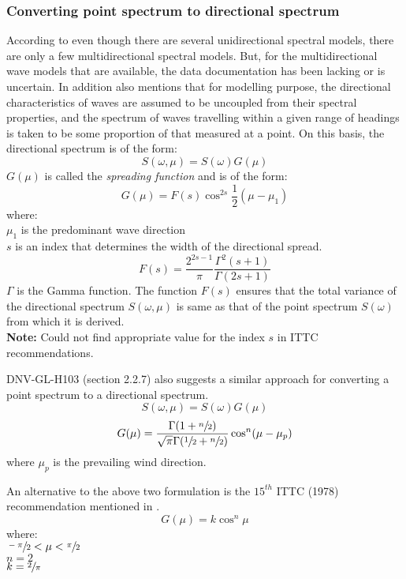 \subsubsection{Converting point spectrum to directional spectrum}
\label{Converting point spectrum to directional spectrum}
According to \cite{stansberg2002specialist} even though there are several
unidirectional spectral models, there are only a few multidirectional spectral
models. But, for the multidirectional wave models that are available, the 
data documentation has been lacking or is uncertain. In addition
\cite{stansberg2002specialist} also mentions that for modelling purpose, the
directional characteristics of waves are assumed to be uncoupled from their
spectral properties, and the spectrum of waves travelling within a given range
of headings is taken to be some proportion of that measured at a point. On this
basis, the directional spectrum is of the form:
\begin{equation}
  S(\omega, \mu) = S(\omega) G(\mu)
\end{equation}
$G(\mu)$ is called the \textit{spreading function} and is of the form:
\begin{equation}
  G(\mu) = F(s) \cos^{2s} \frac{1}{2} (\mu - \mu_1)
\end{equation}
where:\\ 
$\mu_1$ is the predominant wave direction  \\
$s$ is an index that determines the width of the directional spread.
\begin{equation}
  F(s) = \frac{2^{2s - 1}}{\pi} \frac{\Gamma^2 (s+1)}{\Gamma (2s + 1)}
\end{equation}
$\Gamma$ is the Gamma function. The function $F(s)$ ensures that the total
variance of the directional spectrum $S(\omega, \mu)$ is same as that of the
point spectrum $S(\omega)$ from which it is derived.\\
\textbf{Note:} Could not find appropriate value for the index $s$ in ITTC 
recommendations.


DNV-GL-H103 \cite{dnv2014recommended} (section 2.2.7) also suggests a similar
approach for converting a point spectrum to a directional spectrum. 
\begin{equation}
  S(\omega, \mu) = S(\omega) G(\mu)
\end{equation}
\begin{equation}
  G(\mu) = \frac{\Gamma(1 + \sfrac{n}{2})}
                {\sqrt{\pi} \Gamma(\sfrac{1}{2} + \sfrac{n}{2})}
           \cos^n (\mu - \mu_p)
\end{equation}
where $\mu_p$ is the prevailing wind direction.

An alternative to the above two formulation is the $15^{th}$ ITTC (1978) 
recommendation mentioned in \cite{lewis1988principles}.
\begin{equation}
  G(\mu) = k \cos^n \mu
\end{equation}
where: \\ 
$\sfrac{-\pi}{2} < \mu < \sfrac{\pi}{2}$\\ 
$n = 2$ \\
$k = \sfrac{2}{\pi}$



